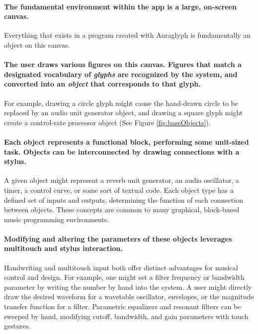 \documentclass[10pt,letterpaper]{article}
\begin{document}
\paragraph{The fundamental environment within the app is a large, on-screen canvas.} 
Everything that exists in a program created with Auraglyph is fundamentally an object on this canvas. 

\paragraph{The user draws various figures on this canvas. 
Figures that match a designated vocabulary of \emph{glyphs} are recognized by the system, and converted into an \emph{object} that corresponds to that glyph.} 
For example, drawing a circle glyph might cause the hand-drawn circle to be replaced by an audio unit generator object, and drawing a square glyph might create a control-rate processor object (See Figure \ref{fig:baseObjects}).

\paragraph{Each object represents a functional block, performing some unit-sized task.
Objects can be interconnected by drawing connections with a stylus.}
A given object might represent a reverb unit generator, an audio oscillator, a timer, a control curve, or some sort of textual code. 
Each object type has a defined set of inputs and outputs, determining the function of each connection between objects. 
These concepts are common to many graphical, block-based music programming environments. 

\paragraph{Modifying and altering the parameters of these objects leverages multitouch and stylus interaction.}
Handwriting and multitouch input both offer distinct advantages for musical control and design. 
For example, one might set a filter frequency or bandwidth parameter by writing the number by hand into the system. 
A user might directly draw the desired waveform for a wavetable oscillator, envelopes, or the magnitude transfer function for a filter. 
Parametric equalizers and resonant filters can be sweeped by hand, modifying cutoff, bandwidth, and gain parameters with touch gestures. 
\end{document}
